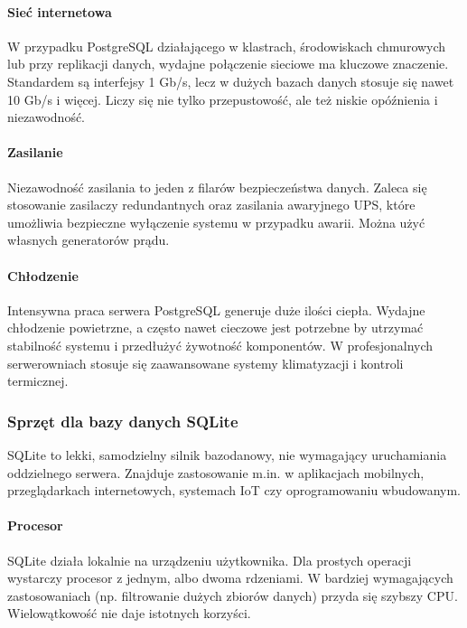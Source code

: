 \documentclass[letterpaper,10pt,polish]{sphinxmanual}
\begin{document}
\paragraph{Sieć internetowa}
\label{\detokenize{rozdzial2/Sprzet-dla-bazy-danych/source/SprzetDlaBazyDanych:siec-internetowa}}
\sphinxAtStartPar
W przypadku PostgreSQL działającego w klastrach, środowiskach chmurowych lub przy replikacji danych, wydajne połączenie sieciowe ma kluczowe znaczenie. Standardem są interfejsy 1 Gb/s, lecz w dużych bazach danych stosuje się nawet 10 Gb/s i więcej. Liczy się nie tylko przepustowość, ale też niskie opóźnienia i niezawodność.


\paragraph{Zasilanie}
\label{\detokenize{rozdzial2/Sprzet-dla-bazy-danych/source/SprzetDlaBazyDanych:zasilanie}}
\sphinxAtStartPar
Niezawodność zasilania to jeden z filarów bezpieczeństwa danych. Zaleca się stosowanie zasilaczy redundantnych oraz zasilania awaryjnego UPS, które umożliwia bezpieczne wyłączenie systemu w przypadku awarii. Można użyć własnych generatorów prądu.


\paragraph{Chłodzenie}
\label{\detokenize{rozdzial2/Sprzet-dla-bazy-danych/source/SprzetDlaBazyDanych:chlodzenie}}
\sphinxAtStartPar
Intensywna praca serwera PostgreSQL generuje duże ilości ciepła. Wydajne chłodzenie powietrzne, a często nawet cieczowe jest potrzebne by utrzymać stabilność systemu i przedłużyć żywotność komponentów. W profesjonalnych serwerowniach stosuje się zaawansowane systemy klimatyzacji i kontroli termicznej.


\subsubsection{Sprzęt dla bazy danych SQLite}
\label{\detokenize{rozdzial2/Sprzet-dla-bazy-danych/source/SprzetDlaBazyDanych:sprzet-dla-bazy-danych-sqlite}}
\sphinxAtStartPar
SQLite to lekki, samodzielny silnik bazodanowy, nie wymagający uruchamiania oddzielnego serwera. Znajduje zastosowanie m.in. w aplikacjach mobilnych, przeglądarkach internetowych, systemach IoT czy oprogramowaniu wbudowanym.


\paragraph{Procesor}
\label{\detokenize{rozdzial2/Sprzet-dla-bazy-danych/source/SprzetDlaBazyDanych:id1}}
\sphinxAtStartPar
SQLite działa lokalnie na urządzeniu użytkownika. Dla prostych operacji wystarczy procesor z jednym, albo dwoma rdzeniami. W bardziej wymagających zastosowaniach (np. filtrowanie dużych zbiorów danych) przyda się szybszy CPU. Wielowątkowość nie daje istotnych korzyści.
\end{document}
